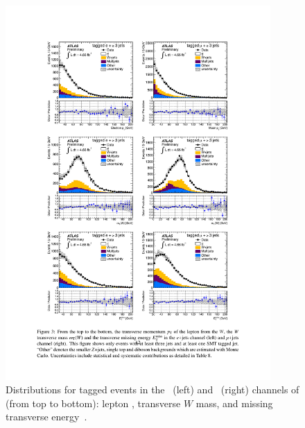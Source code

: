 \begin{figure}[htbp]
  \centering
    \includegraphics[width=0.90\textwidth]{PartCrossSection/Plots/h_stacks_elmu_evt_pars.pdf}
    \caption[Distributions for tagged events in the \ejets\ (left) and \mujets\ (right) channels of (from top to bottom): lepton \pt, transverse $W$ mass, and missing transverse energy.]{Distributions for tagged events in the \ejets\ (left) and \mujets\ (right) channels of (from top to bottom): lepton \pt, transverse $W$ mass, and missing transverse energy~\cite{Cross:SMTCrossSectionPaper}.}\label{fig:CrossBackgroundShapes}
\end{figure}

